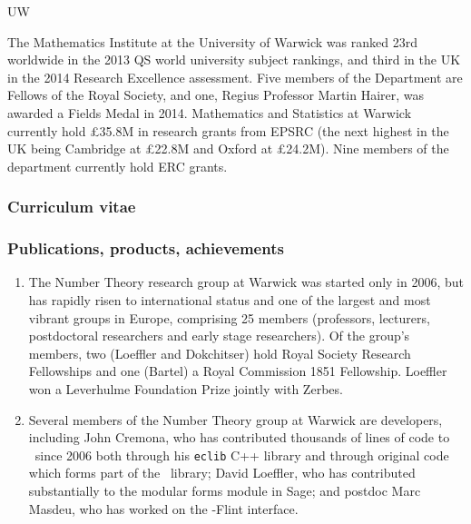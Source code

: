 \begin{sitedescription}{UW}

The Mathematics Institute at the University of Warwick was ranked 23rd
worldwide in the 2013 QS world university subject rankings, and third in
the UK in the 2014 Research Excellence assessment.  Five
members of the Department are Fellows of the Royal Society, and one,
Regius Professor Martin Hairer, was awarded a Fields Medal in 2014.
Mathematics and Statistics at Warwick currently hold £35.8M in
research grants from EPSRC (the next highest in the UK being Cambridge
at £22.8M and Oxford at £24.2M).  Nine members of the department
currently hold ERC grants.



\subsubsection*{Curriculum vitae}




%
%
%

\subsubsection*{Publications, products, achievements}
\begin{enumerate}
\item
The Number Theory research group at Warwick was started only in 2006,
but has rapidly risen to international status and one of the largest
and most vibrant groups in Europe, comprising 25 members (professors,
lecturers, postdoctoral researchers and early stage researchers).  Of
the group's members, two (Loeffler and Dokchitser) hold Royal Society
Research Fellowships and one (Bartel) a Royal Commission 1851
Fellowship.  Loeffler won a Leverhulme Foundation Prize jointly with
Zerbes.
\item
Several members of the Number Theory group at Warwick are \Sage
developers, including John Cremona, who has contributed thousands of
lines of code to \Sage\ since 2006 both through his {\tt eclib} C++
library and through original \Python code which forms part of the
\Sage\ library; David Loeffler, who has contributed substantially to
the modular forms module in Sage; and postdoc Marc Masdeu, who has
worked on the \Sage-Flint interface.
\end{enumerate}


\end{sitedescription}
